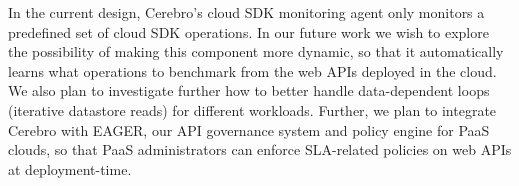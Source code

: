 
In the current design, Cerebro's cloud SDK monitoring agent only monitors 
a predefined set of cloud SDK operations. In our future work we wish 
to explore the possibility of making this component more dynamic,
so that it automatically learns what operations to benchmark from the web APIs 
deployed in the cloud. We also plan to investigate further how to better
handle data-dependent loops (iterative datastore reads) for different workloads. 
Further, we plan
to integrate Cerebro with EAGER, our API governance system 
and policy engine for PaaS clouds, so 
that PaaS administrators can enforce SLA-related policies on web APIs at deployment-time.
